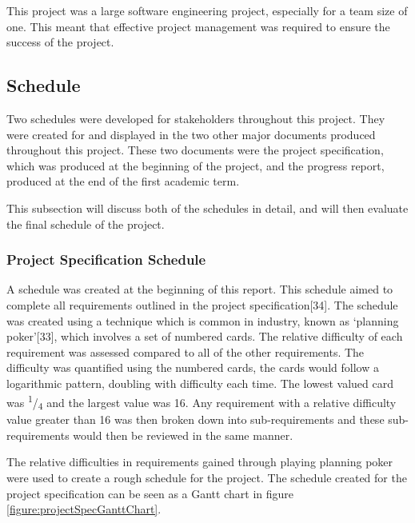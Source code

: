 \documentclass{article}
\begin{document}
This project was a large software engineering project, especially for a team size of one. This meant that effective project management was required to ensure the success of the project. \par

\subsection{Schedule}

Two schedules were developed for stakeholders throughout this project. They were created for and displayed in the two other major documents produced throughout this project. These two documents were the project specification, which was produced at the beginning of the project, and the progress report, produced at the end of the first academic term. \par

This subsection will discuss both of the schedules in detail, and will then evaluate the final schedule of the project. \par

\subsubsection{Project Specification Schedule}

A schedule was created at the beginning of this report. This schedule aimed to complete all requirements outlined in the project specification[34]. The schedule was created using a technique which is common in industry, known as `planning poker'[33], which involves a set of numbered cards. The relative difficulty of each requirement was assessed compared to all of the other requirements. The difficulty was quantified using the numbered cards, the cards would follow a logarithmic pattern, doubling with difficulty each time. The lowest valued card was \textsuperscript{1}/\textsubscript{4} and the largest value was 16. Any requirement with a relative difficulty value greater than 16 was then broken down into sub-requirements and these sub-requirements would then be reviewed in the same manner. \par

The relative difficulties in requirements gained through playing planning poker were used to create a rough schedule for the project. The schedule created for the project specification can be seen as a Gantt chart in figure \ref{figure:projectSpecGanttChart}. \par
\end{document}
